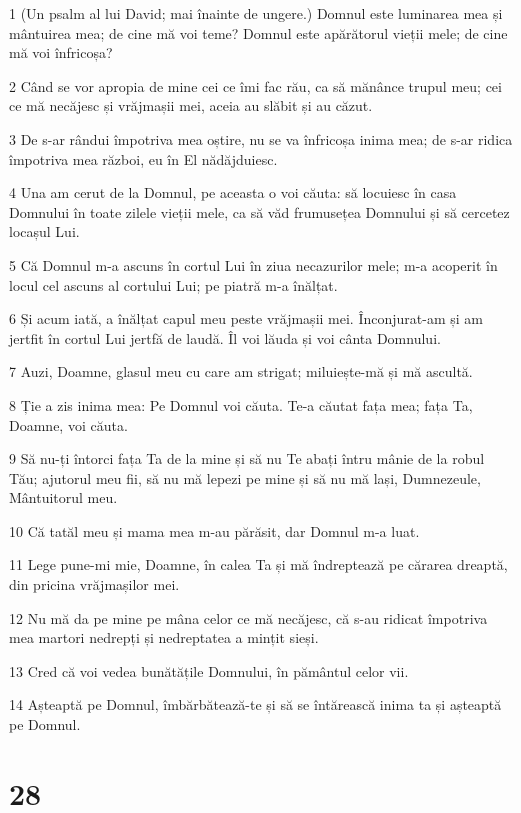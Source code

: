 \par 1 (Un psalm al lui David; mai înainte de ungere.) Domnul este luminarea mea și mântuirea mea; de cine mă voi teme? Domnul este apărătorul vieții mele; de cine mă voi înfricoșa?
\par 2 Când se vor apropia de mine cei ce îmi fac rău, ca să mănânce trupul meu; cei ce mă necăjesc și vrăjmașii mei, aceia au slăbit și au căzut.
\par 3 De s-ar rândui împotriva mea oștire, nu se va înfricoșa inima mea; de s-ar ridica împotriva mea război, eu în El nădăjduiesc.
\par 4 Una am cerut de la Domnul, pe aceasta o voi căuta: să locuiesc în casa Domnului în toate zilele vieții mele, ca să văd frumusețea Domnului și să cercetez locașul Lui.
\par 5 Că Domnul m-a ascuns în cortul Lui în ziua necazurilor mele; m-a acoperit în locul cel ascuns al cortului Lui; pe piatră m-a înălțat.
\par 6 Și acum iată, a înălțat capul meu peste vrăjmașii mei. Înconjurat-am și am jertfit în cortul Lui jertfă de laudă. Îl voi lăuda și voi cânta Domnului.
\par 7 Auzi, Doamne, glasul meu cu care am strigat; miluiește-mă și mă ascultă.
\par 8 Ție a zis inima mea: Pe Domnul voi căuta. Te-a căutat fața mea; fața Ta, Doamne, voi căuta.
\par 9 Să nu-ți întorci fața Ta de la mine și să nu Te abați întru mânie de la robul Tău; ajutorul meu fii, să nu mă lepezi pe mine și să nu mă lași, Dumnezeule, Mântuitorul meu.
\par 10 Că tatăl meu și mama mea m-au părăsit, dar Domnul m-a luat.
\par 11 Lege pune-mi mie, Doamne, în calea Ta și mă îndreptează pe cărarea dreaptă, din pricina vrăjmașilor mei.
\par 12 Nu mă da pe mine pe mâna celor ce mă necăjesc, că s-au ridicat împotriva mea martori nedrepți și nedreptatea a mințit sieși.
\par 13 Cred că voi vedea bunătățile Domnului, în pământul celor vii.
\par 14 Așteaptă pe Domnul, îmbărbătează-te și să se întărească inima ta și așteaptă pe Domnul.

\chapter{28}

